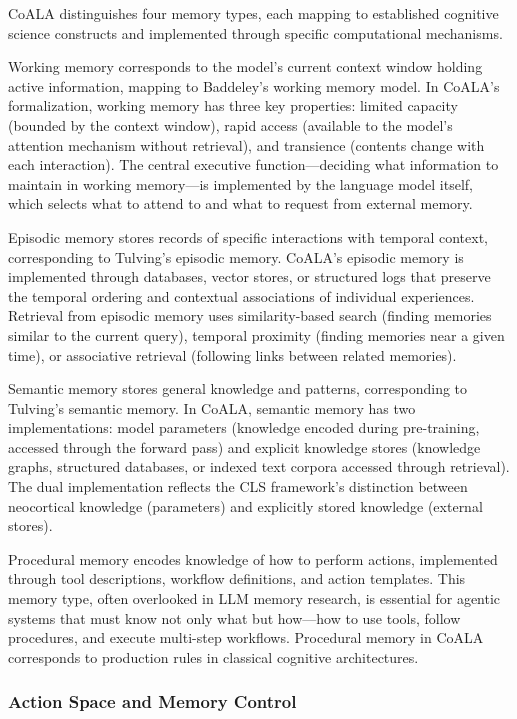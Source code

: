 \documentclass[11pt,letterpaper]{article}
\begin{document}
CoALA distinguishes four memory types, each mapping to established cognitive science constructs and implemented through specific computational mechanisms.

Working memory corresponds to the model's current context window holding active information, mapping to Baddeley's working memory model. In CoALA's formalization, working memory has three key properties: limited capacity (bounded by the context window), rapid access (available to the model's attention mechanism without retrieval), and transience (contents change with each interaction). The central executive function---deciding what information to maintain in working memory---is implemented by the language model itself, which selects what to attend to and what to request from external memory.

Episodic memory stores records of specific interactions with temporal context, corresponding to Tulving's episodic memory. CoALA's episodic memory is implemented through databases, vector stores, or structured logs that preserve the temporal ordering and contextual associations of individual experiences. Retrieval from episodic memory uses similarity-based search (finding memories similar to the current query), temporal proximity (finding memories near a given time), or associative retrieval (following links between related memories).

Semantic memory stores general knowledge and patterns, corresponding to Tulving's semantic memory. In CoALA, semantic memory has two implementations: model parameters (knowledge encoded during pre-training, accessed through the forward pass) and explicit knowledge stores (knowledge graphs, structured databases, or indexed text corpora accessed through retrieval). The dual implementation reflects the CLS framework's distinction between neocortical knowledge (parameters) and explicitly stored knowledge (external stores).

Procedural memory encodes knowledge of how to perform actions, implemented through tool descriptions, workflow definitions, and action templates. This memory type, often overlooked in LLM memory research, is essential for agentic systems that must know not only what but how---how to use tools, follow procedures, and execute multi-step workflows. Procedural memory in CoALA corresponds to production rules in classical cognitive architectures.

\subsubsection{Action Space and Memory Control}
\end{document}
